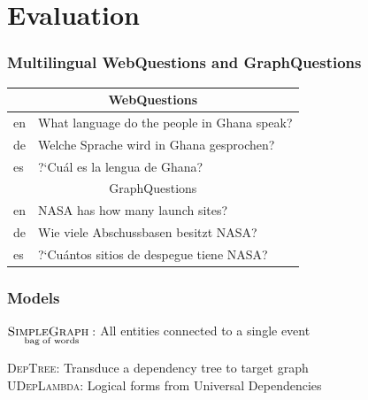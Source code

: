 \documentclass[mathserif,12pt]{beamer}
\newcommand{\hlight}[1]{{\color{blue!80} #1}}
\newcommand \deptree{\textsc{DepTree}\xspace}
\newcommand \simplegraph{\textsc{SimpleGraph}\xspace}
\newcommand \ccggraph{\textsc{CCGGraph}\xspace}
\begin{document}
\section{Evaluation} 

\begin{frame}
\frametitle{Multilingual WebQuestions and GraphQuestions}
\centering
\large
\begin{tabular}{l l}
\midrule
\multicolumn{2}{c}{WebQuestions} \\
\midrule
en & What language do the people in Ghana speak?\\
de & Welche Sprache wird in Ghana gesprochen?\\
es & ?`Cu\'{a}l es la lengua de Ghana?\\
\midrule
\multicolumn{2}{c}{GraphQuestions} \\
\midrule
en & NASA has how many launch sites? \\
de & Wie viele Abschussbasen besitzt NASA? \\
es & ?`Cu\'{a}ntos sitios de despegue tiene NASA? \\
\end{tabular}
\end{frame}

\begin{frame}
\large
\frametitle{Models}
\hlight{$\underset{\mathrm{bag\; of\; words}}{\simplegraph:}$ }All entities connected to a single event



\vspace{2em}
\hlight{\deptree:} Transduce a dependency tree to target graph \\

\vspace{2em}
\hlight{\textsc{UDepLambda}:} Logical forms from Universal Dependencies \\

\end{frame}
\end{document}
